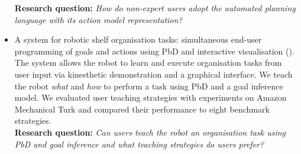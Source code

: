 \begin{itemize}
{    \textbf{Research question:} \textit{How do non-expert users adopt the automated planning language with its action model representation?}}
    \item {A system for robotic shelf organisation tasks: simultaneous end-user programming of goals and actions using PbD and interactive visualisation (\cite{liang2018simultaneous}).
    The system allows the robot to learn and execute organisation tasks from user input via kinesthetic demonstration and a graphical interface.
    We teach the robot \textit{what} and \textit{how} to perform a task using PbD and a goal inference model.
    We evaluated user teaching strategies with experiments on Amazon Mechanical Turk and compared their performance to eight benchmark strategies.\\
    \textbf{Research question:} \textit{Can users teach the robot an organisation task using PbD and goal inference and what teaching strategies do users prefer?}}
\end{itemize}
